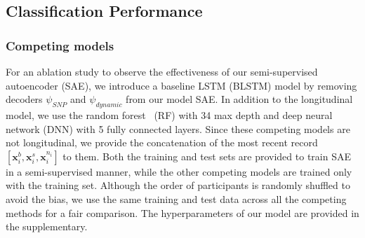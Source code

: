 \subsection{Classification Performance}
\subsubsection{Competing models}
For an ablation study to observe the effectiveness of our semi-supervised autoencoder (SAE), we introduce a baseline LSTM (BLSTM) model by removing decoders $\psi_{SNP}$ and $\psi_{dynamic}$ from our model SAE. In addition to the longitudinal model, we use the random forest~\cite{ho1995random} (RF) with 34 max depth and deep neural network (DNN) with 5 fully connected layers. Since these competing models are not longitudinal, we provide the concatenation of the most recent record $[\mathbf{x}_i^b, \mathbf{x}_i^s, \mathbf{x}_i^{n_i}]$ to them. Both the training and test sets are provided to train SAE in a semi-supervised manner, while the other competing models are trained only with the training set. Although the order of participants is randomly shuffled to avoid the bias, we use the same training and test data across all the competing methods for a fair comparison. The hyperparameters of our model are provided in the supplementary.
